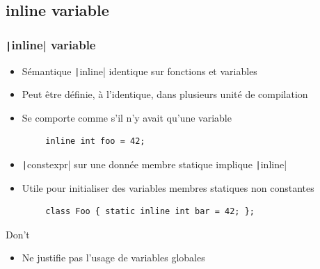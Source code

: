 \documentclass[C++.tex]{subfiles}
\begin{document}
\subsection*{inline variable}
\begin{frame}[fragile]
	\frametitle{\texttt|inline| variable}
	\begin{itemize}
		\item Sémantique \texttt|inline| identique sur fonctions et variables
		\item Peut être définie, à l'identique, dans plusieurs unité de compilation
		\item Se comporte comme s'il n'y avait qu'une variable
	\end{itemize}

	\begin{verbatim}
		inline int foo = 42;
	\end{verbatim}

	\begin{itemize}
		\item \texttt|constexpr| sur une donnée membre statique implique \texttt|inline|
		\item Utile pour initialiser des variables membres statiques non constantes
	\end{itemize}

	\begin{verbatim}
		class Foo { static inline int bar = 42; };
	\end{verbatim}

	\begin{alertblock}{Don't}
		\begin{itemize}
			\item Ne justifie pas l'usage de variables globales
		\end{itemize}
	\end{alertblock}
\end{frame}
\end{document}
